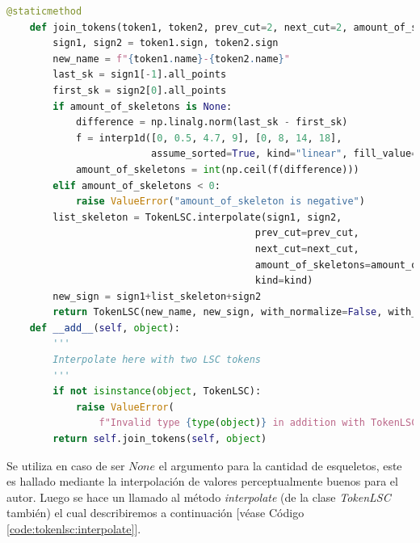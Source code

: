 \begin{lstlisting}[basicstyle=\tiny,language=Python, caption={Método utilizados para la unión de tokens TokenLSC}, label={code:tokenlsc:unionmethods}] 
@staticmethod
    def join_tokens(token1, token2, prev_cut=2, next_cut=2, amount_of_skeletons=None, kind='linear'):
        sign1, sign2 = token1.sign, token2.sign
        new_name = f"{token1.name}-{token2.name}"
        last_sk = sign1[-1].all_points
        first_sk = sign2[0].all_points
        if amount_of_skeletons is None:
            difference = np.linalg.norm(last_sk - first_sk)
            f = interp1d([0, 0.5, 4.7, 9], [0, 8, 14, 18],
                         assume_sorted=True, kind="linear", fill_value="extrapolate")
            amount_of_skeletons = int(np.ceil(f(difference)))
        elif amount_of_skeletons < 0:
            raise ValueError("amount_of_skeleton is negative")
        list_skeleton = TokenLSC.interpolate(sign1, sign2,
                                           prev_cut=prev_cut,
                                           next_cut=next_cut,
                                           amount_of_skeletons=amount_of_skeletons,
                                           kind=kind)
        new_sign = sign1+list_skeleton+sign2
        return TokenLSC(new_name, new_sign, with_normalize=False, with_crop=False)
    def __add__(self, object):
        '''
        Interpolate here with two LSC tokens
        '''
        if not isinstance(object, TokenLSC):
            raise ValueError(
                f"Invalid type {type(object)} in addition with TokenLSC")
        return self.join_tokens(self, object) 
\end{lstlisting}

Se utiliza en caso de ser $None$ el argumento para la cantidad de esqueletos, este es hallado mediante la interpolación de valores perceptualmente buenos para el autor. Luego se hace un llamado al método \textit{interpolate} (de la clase \textit{TokenLSC} también) el cual describiremos a continuación [véase Código \ref{code:tokenlsc:interpolate}].


